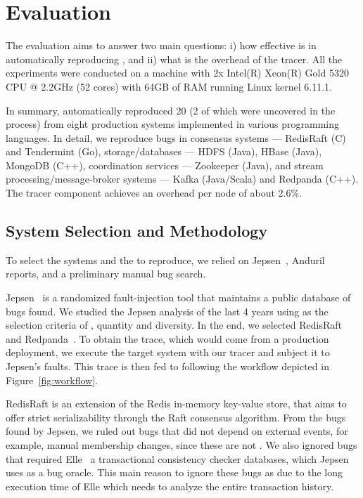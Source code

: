 \section{Evaluation}
\label{sec:evaluation}

The evaluation aims to answer two main questions:
i) how effective is \sys in automatically reproducing \efib, and
ii) what is the overhead of the tracer.
All the experiments were conducted on a machine with 2x Intel(R) Xeon(R) Gold 5320 CPU @ 2.2GHz (52 cores) with 64GB of RAM running Linux kernel 6.11.1.

In summary, \sys automatically reproduced 20 \efibshort (2 of which were uncovered in the process) from eight production systems implemented in various programming languages.
In detail, we reproduce bugs in consensus systems --- RedisRaft (C) and Tendermint (Go), storage/databases --- HDFS (Java), HBase (Java), MongoDB (C++), coordination services --- Zookeeper (Java), and stream processing/message-broker systems --- Kafka (Java/Scala) and Redpanda (C++).
The tracer component achieves an overhead per node of about $2.6\%$.

\subsection{System Selection and Methodology}
To select the systems and the \efib to reproduce, we relied on Jepsen~\cite{jepsen}, Anduril~\cite{anduril} reports, and a preliminary manual bug search.

Jepsen~\cite{jepsen} is a randomized fault-injection tool that maintains a public database of bugs found.
We studied the Jepsen analysis of the last 4 years using as the selection criteria of \efibshort, quantity and diversity.
In the end, we selected RedisRaft\cite{redisraft,redisraftreport} and Redpanda~\cite{redpanda,redpandareport}.
To obtain the trace, which would come from a production deployment, we execute the target system with our tracer and subject it to Jepsen's faults.
This trace is then fed to \sys following the workflow depicted in Figure~\ref{fig:workflow}.


RedisRaft is an extension of the Redis in-memory key-value store, that aims to offer strict serializability through the Raft consensus algorithm.
From the bugs found by Jepsen, we ruled out bugs that did not depend on external events, for example, manual membership changes, since these are not \efibshort.
We also ignored bugs that required Elle~\cite{elle} a transactional consistency checker databases, which Jepsen uses as a bug oracle.
This main reason to ignore these bugs as due to the long execution time of Elle which needs to analyze the entire transaction history.

